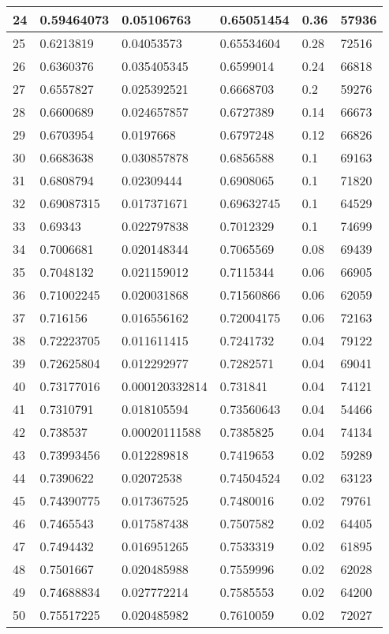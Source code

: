 \begin{longtable}{|l|l|l|l|l|l|}
24 & 0.59464073 & 0.05106763 & 0.65051454 & 0.36 & 57936 \\ \hline 
25 & 0.6213819 & 0.04053573 & 0.65534604 & 0.28 & 72516 \\ \hline 
26 & 0.6360376 & 0.035405345 & 0.6599014 & 0.24 & 66818 \\ \hline 
27 & 0.6557827 & 0.025392521 & 0.6668703 & 0.2 & 59276 \\ \hline 
28 & 0.6600689 & 0.024657857 & 0.6727389 & 0.14 & 66673 \\ \hline 
29 & 0.6703954 & 0.0197668 & 0.6797248 & 0.12 & 66826 \\ \hline 
30 & 0.6683638 & 0.030857878 & 0.6856588 & 0.1 & 69163 \\ \hline 
31 & 0.6808794 & 0.02309444 & 0.6908065 & 0.1 & 71820 \\ \hline 
32 & 0.69087315 & 0.017371671 & 0.69632745 & 0.1 & 64529 \\ \hline 
33 & 0.69343 & 0.022797838 & 0.7012329 & 0.1 & 74699 \\ \hline 
34 & 0.7006681 & 0.020148344 & 0.7065569 & 0.08 & 69439 \\ \hline 
35 & 0.7048132 & 0.021159012 & 0.7115344 & 0.06 & 66905 \\ \hline 
36 & 0.71002245 & 0.020031868 & 0.71560866 & 0.06 & 62059 \\ \hline 
37 & 0.716156 & 0.016556162 & 0.72004175 & 0.06 & 72163 \\ \hline 
38 & 0.72223705 & 0.011611415 & 0.7241732 & 0.04 & 79122 \\ \hline 
39 & 0.72625804 & 0.012292977 & 0.7282571 & 0.04 & 69041 \\ \hline 
40 & 0.73177016 & 0.000120332814 & 0.731841 & 0.04 & 74121 \\ \hline 
41 & 0.7310791 & 0.018105594 & 0.73560643 & 0.04 & 54466 \\ \hline 
42 & 0.738537 & 0.00020111588 & 0.7385825 & 0.04 & 74134 \\ \hline 
43 & 0.73993456 & 0.012289818 & 0.7419653 & 0.02 & 59289 \\ \hline 
44 & 0.7390622 & 0.02072538 & 0.74504524 & 0.02 & 63123 \\ \hline 
45 & 0.74390775 & 0.017367525 & 0.7480016 & 0.02 & 79761 \\ \hline 
46 & 0.7465543 & 0.017587438 & 0.7507582 & 0.02 & 64405 \\ \hline 
47 & 0.7494432 & 0.016951265 & 0.7533319 & 0.02 & 61895 \\ \hline 
48 & 0.7501667 & 0.020485988 & 0.7559996 & 0.02 & 62028 \\ \hline 
49 & 0.74688834 & 0.027772214 & 0.7585553 & 0.02 & 64200 \\ \hline 
50 & 0.75517225 & 0.020485982 & 0.7610059 & 0.02 & 72027 \\ \hline 
\end{longtable}